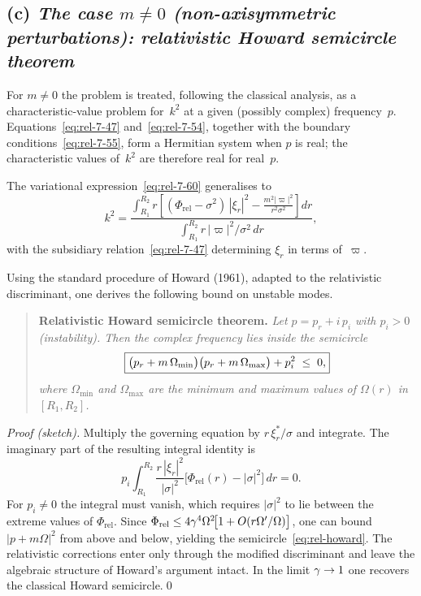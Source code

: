 \subsection*{(c) \emph{The case $m\neq0$ (non-axisymmetric
  perturbations): relativistic Howard semicircle theorem}}
\label{sec:rel-7-67c}

For $m\neq 0$ the problem is treated, following the classical analysis,
as a characteristic-value problem for~$k^{2}$ at a given (possibly
complex) frequency~$p$.  Equations~\eqref{eq:rel-7-47}
and~\eqref{eq:rel-7-54}, together with the boundary
conditions~\eqref{eq:rel-7-55}, form a Hermitian system when $p$ is
real; the characteristic values of~$k^{2}$ are therefore real for real~$p$.

The variational expression~\eqref{eq:rel-7-60} generalises to
\begin{equation}
\label{eq:rel-7-66}
k^{2}
= \frac{\displaystyle\int_{R_1}^{R_2}
    r\!\left[(\Phi_{\mathrm{rel}}-\sigma^{2})\,|\xi_r|^{2}
    - \frac{m^{2}|\varpi|^{2}}{r^{2}\sigma^{2}}\right]dr}
  {\displaystyle\int_{R_1}^{R_2}
    r\,|\varpi|^{2}/\sigma^{2}\,dr},
\end{equation}
with the subsidiary relation~\eqref{eq:rel-7-47} determining
$\xi_r$ in terms of~$\varpi$.

Using the standard procedure of Howard (1961), adapted to the
relativistic discriminant, one derives the following bound on unstable
modes.

\begin{quote}
\textbf{Relativistic Howard semicircle theorem.}\quad
\emph{Let $p = p_r + i\,p_i$ with $p_i>0$ (instability).
Then the complex frequency lies inside the semicircle}
\begin{equation}
\label{eq:rel-howard}
\boxed{%
\bigl(p_r + m\,\Omega_{\min}\bigr)
\bigl(p_r + m\,\Omega_{\max}\bigr)
+ p_i^{2}\;\le\;0,}
\end{equation}
\emph{where $\Omega_{\min}$ and $\Omega_{\max}$ are the minimum and
maximum values of $\Omega(r)$ in $[R_1,R_2]$.}
\end{quote}

\noindent\emph{Proof (sketch).}\quad
Multiply the governing equation by $r\,\xi_r^{*}/\sigma$ and integrate.
The imaginary part of the resulting integral identity is
\begin{equation}
\label{eq:rel-howard-imag}
p_i\!\int_{R_1}^{R_2}
  \frac{r\,|\xi_r|^{2}}{|\sigma|^{2}}
  \bigl[\Phi_{\mathrm{rel}}(r)-|\sigma|^{2}\bigr]\,dr = 0.
\end{equation}
For $p_i\neq0$ the integral must vanish, which requires $|\sigma|^{2}$
to lie between the extreme values of $\Phi_{\mathrm{rel}}$.
Since $\Phi_{\mathrm{rel}}\le
4\gamma^{4}\Omega^{2}\!\bigl[1+O(r\Omega'/\Omega)\bigr]$, one can bound
$|p+m\Omega|^{2}$ from above and below, yielding the
semicircle~\eqref{eq:rel-howard}.  The relativistic corrections enter
only through the modified discriminant and leave the algebraic structure
of Howard's argument intact.  In the limit $\gamma\to1$ one recovers the
classical Howard semicircle.\qed

